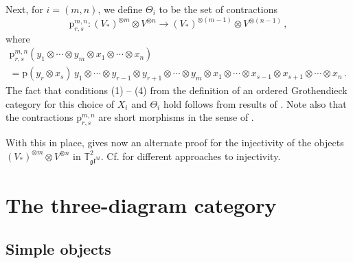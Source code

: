 \documentclass[11pt]{article}
\theoremstyle{plain}
\theoremstyle{nonumberplain}
\theoremstyle{plain}
\theoremstyle{nonumberplain}
\newcommand\bT{{\mathbb T}}
\newcommand\fg{\mathfrak{g}}
\newcommand\fgl{\mathfrak{gl}}
\begin{document}
Next, for $i=(m,n)$, we define $\Theta_i$ to be the set of contractions 
\begin{equation*}
  \mathrm{p}^{m,n}_{r,s}:(V_*)^{\otimes m}\otimes V^{\otimes n}\to   (V_*)^{\otimes (m-1)}\otimes V^{\otimes (n-1)}\,,
\end{equation*}
where
\begin{align*}
\mathrm{p}^{m,n}_{r,s}\left(y_1\otimes \cdots \otimes y_m\otimes x_1 \otimes \cdots\otimes x_n\right)\phantom{p_{r,s}\left(y_1\otimes \cdots \otimes y_m\otimes x_1 \otimes \cdots\otimes x_n\right)p\left(y_r\otimes x_s\right)\,y_1\otimes\cdots\otimes }
\\=\mathrm{p}\left(y_r\otimes x_s\right)\,y_1\otimes\cdots\otimes y_{r-1}\otimes y_{r+1}\otimes \cdots \otimes y_m
\otimes x_1\otimes \cdots \otimes x_{s-1}\otimes x_{s+1}\otimes \cdots \otimes x_n\,.
\end{align*}  The fact that conditions (1) -- (4) from the definition of an ordered Grothendieck category for this choice of $X_i$ and $\Theta_i$ hold follows from results of \cite{PS}.  Note also that the contractions $\mathrm{p}_{r,s}^{m,n}$ are short morphisms in the sense of .


With this in place,  gives now an alternate proof for the injectivity of the objects $(V_*)^{\otimes m}\otimes V^{\otimes n}$ in $\bT^2_{\fgl^M}$. Cf. \cite{DPS,SS} for different approaches to injectivity. 




\section{The three-diagram category}\label{se.3d}




\subsection{Simple objects}


\end{document}

